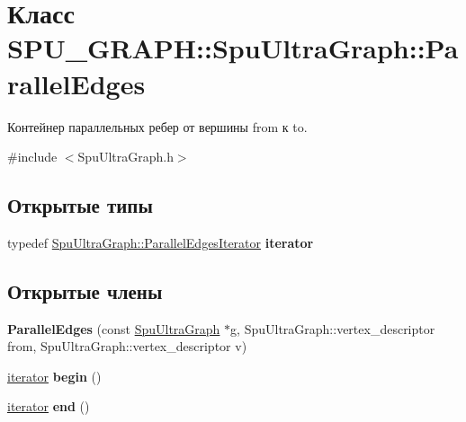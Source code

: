 \hypertarget{class_s_p_u___g_r_a_p_h_1_1_spu_ultra_graph_1_1_parallel_edges}{}\section{Класс S\+P\+U\+\_\+\+G\+R\+A\+PH\+:\+:Spu\+Ultra\+Graph\+:\+:Parallel\+Edges}
\label{class_s_p_u___g_r_a_p_h_1_1_spu_ultra_graph_1_1_parallel_edges}


Контейнер параллельных ребер от вершины from к to.  




{\ttfamily \#include $<$Spu\+Ultra\+Graph.\+h$>$}

\subsection*{Открытые типы}
\begin{DoxyCompactItemize}
\item 
\mbox{\label{class_s_p_u___g_r_a_p_h_1_1_spu_ultra_graph_1_1_parallel_edges_ac6acbdf0cf545980c2149245bd7ec649}} 
typedef \hyperlink{class_s_p_u___g_r_a_p_h_1_1_spu_ultra_graph_1_1_parallel_edges_iterator}{Spu\+Ultra\+Graph\+::\+Parallel\+Edges\+Iterator} {\bfseries iterator}
\end{DoxyCompactItemize}
\subsection*{Открытые члены}
\begin{DoxyCompactItemize}
\item 
\mbox{\label{class_s_p_u___g_r_a_p_h_1_1_spu_ultra_graph_1_1_parallel_edges_aa24e6b36e0900fcaab05bc2d52b36335}} 
{\bfseries Parallel\+Edges} (const \hyperlink{class_s_p_u___g_r_a_p_h_1_1_spu_ultra_graph}{Spu\+Ultra\+Graph} $\ast$g, Spu\+Ultra\+Graph\+::vertex\+\_\+descriptor from, Spu\+Ultra\+Graph\+::vertex\+\_\+descriptor v)
\item 
\mbox{\label{class_s_p_u___g_r_a_p_h_1_1_spu_ultra_graph_1_1_parallel_edges_a846d6466a099951584d69a5c77d2f3b4}} 
\hyperlink{class_s_p_u___g_r_a_p_h_1_1_spu_ultra_graph_1_1_parallel_edges_iterator}{iterator} {\bfseries begin} ()
\item 
\mbox{\label{class_s_p_u___g_r_a_p_h_1_1_spu_ultra_graph_1_1_parallel_edges_aee7b25b2bc1aa84677b36de7528fc24d}} 
\hyperlink{class_s_p_u___g_r_a_p_h_1_1_spu_ultra_graph_1_1_parallel_edges_iterator}{iterator} {\bfseries end} ()
\end{DoxyCompactItemize}


